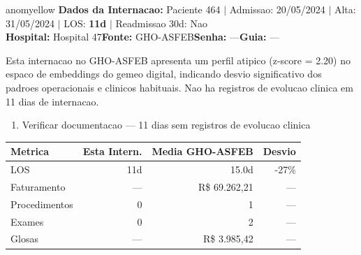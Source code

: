 \documentclass[a4paper,10pt]{article}
\begin{document}
\newpage

\begin{anomalycard}[Internacao 221 | GHO-ASFEB | MODERADO (z=2.20)]{anomyellow}
\textbf{Dados da Internacao:} Paciente 464 $\mid$ Admissao: 20/05/2024 $\mid$ Alta: 31/05/2024 $\mid$ LOS: \textbf{11d} $\mid$ Readmissao 30d: Nao\\
\textbf{Hospital:} Hospital 47\quad\textbf{Fonte:} GHO-ASFEB\quad\textbf{Senha:} ---\quad\textbf{Guia:} ---\\
\vspace{2pt}\begin{tcolorbox}[colback=severityred!20,colframe=anomyellow,title={\textbf{Interpretacao de Negocio}},fonttitle=\bfseries\small,left=4pt,right=4pt,top=3pt,bottom=3pt]
{\small Esta internacao no GHO-ASFEB apresenta um perfil atipico (z-score = 2.20) no espaco de embeddings do gemeo digital, indicando desvio significativo dos padroes operacionais e clinicos habituais. Nao ha registros de evolucao clinica em 11 dias de internacao.}
\end{tcolorbox}
\begin{tcolorbox}[colback=severityyellow!30,colframe=anomorange,title={\textbf{Recomendacoes Especificas}},fonttitle=\bfseries\small,left=4pt,right=4pt,top=3pt,bottom=3pt]
\begin{enumerate}[nosep,leftmargin=16pt]
\item {\small Verificar documentacao --- 11 dias sem registros de evolucao clinica}
\end{enumerate}
\end{tcolorbox}
\begin{center}\begin{tabular}{l r r r}\toprule\textbf{Metrica} & \textbf{Esta Intern.} & \textbf{Media GHO-ASFEB} & \textbf{Desvio} \\\midrule
LOS & 11d & 15.0d & -27\% \\
Faturamento & --- & R\$ 69.262,21 & --- \\
Procedimentos & 0 & 1 & --- \\
Exames & 0 & 2 & --- \\
Glosas & --- & R\$ 3.985,42 & --- \\
\bottomrule\end{tabular}\end{center}


\end{anomalycard}
\end{document}
